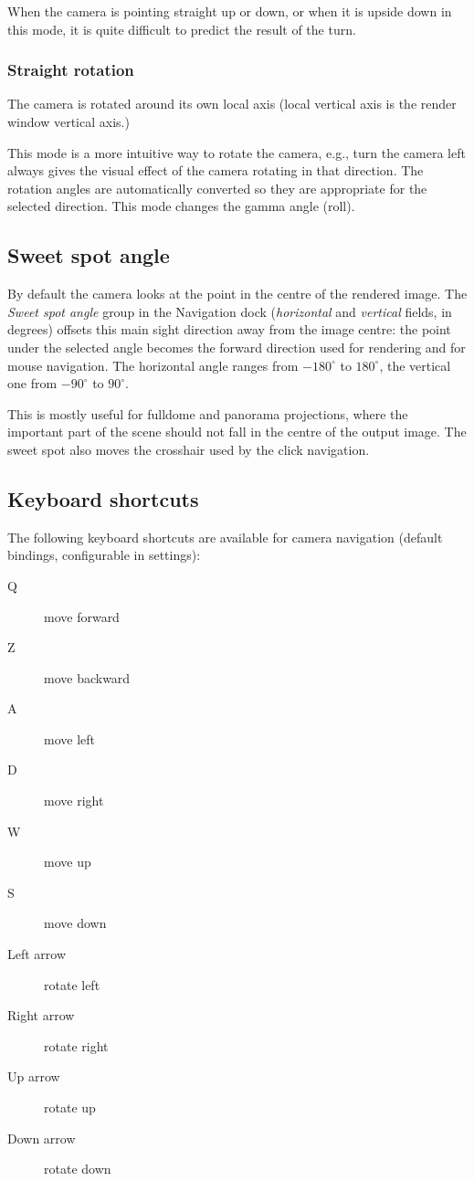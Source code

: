 When the camera is pointing straight up or down, or when it is upside down in
this mode, it is quite difficult to predict the result of the turn.

\subsubsection{Straight rotation}\label{straight-rotation}

The camera is rotated around its own local axis (local vertical axis is the
render window vertical axis.)

This mode is a more intuitive way to rotate the camera, e.g., turn the camera
left always gives the visual effect of the camera rotating in that direction. The
rotation angles are automatically converted so they are appropriate for the
selected direction. This mode changes the gamma angle (roll).

\subsection{Sweet spot angle}\label{navigation-sweet-spot}

By default the camera looks at the point in the centre of the rendered image. The \emph{Sweet spot angle} group in the Navigation dock (\emph{horizontal} and \emph{vertical} fields, in degrees) offsets this main sight direction away from the image centre: the point under the selected angle becomes the forward direction used for rendering and for mouse navigation. The horizontal angle ranges from $-180^\circ$ to $180^\circ$, the vertical one from $-90^\circ$ to $90^\circ$.

This is mostly useful for fulldome and panorama projections, where the important part of the scene should not fall in the centre of the output image. The sweet spot also moves the crosshair used by the click navigation.

\subsection{Keyboard shortcuts}\label{keyboard-shortcuts}

The following keyboard shortcuts are available for camera navigation (default bindings, configurable in settings):

\begin{description}
	\item[Q] move forward
	\item[Z] move backward
	\item[A] move left
	\item[D] move right
	\item[W] move up
	\item[S] move down
	\item[Left arrow] rotate left
	\item[Right arrow] rotate right
	\item[Up arrow] rotate up
	\item[Down arrow] rotate down
\end{description}

